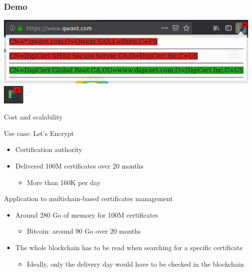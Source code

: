 \begin{frame}
	\frametitle{Demo}
	\begin{center}
		\includegraphics[scale=0.4]{figs/red_certs.png}
		\includegraphics{figs/red_mark.png}
	\end{center}
	
\end{frame}


\begin{frame}{Cost and scalability}

	\begin{exampleblock}{Use case: Let's Encrypt}
		\begin{itemize}
			\item Certification authority
			\item Delivered 100M certificates over 20 months
			\begin{itemize}
				\item More than 160K per day
			\end{itemize}
		\end{itemize}
	\end{exampleblock}
	
	\begin{exampleblock}{Application to multichain-based certificates management}
		\begin{itemize}
			\item Around 280 Go of memory for 100M certificates
			\begin{itemize}
				\item Bitcoin: around 90 Go over 20 months
			\end{itemize}
			\item The whole blockchain has to be read when searching for a specific certificate
			\begin{itemize}
				\item Ideally, only the delivery day would have to be checked in the blockchain
			\end{itemize}
		\end{itemize}
	\end{exampleblock}

\end{frame}